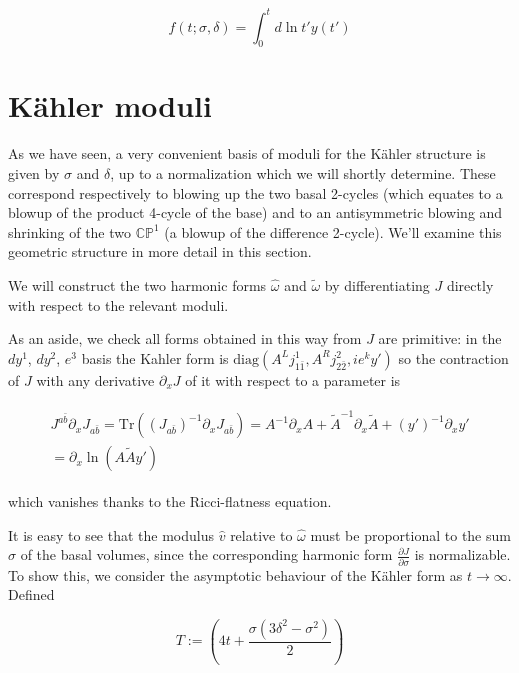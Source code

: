 \begin{equation}
	f(t;\sigma,\delta) = \int_0^{t} d\ln t' y(t')
	\label{}
\end{equation}

\section{K\"ahler moduli}

As we have seen, a very convenient basis of moduli for the K\"ahler structure is given by $\sigma$ and $\delta$, up to a normalization which we will shortly determine. These correspond respectively to blowing up the two basal 2-cycles (which equates to a blowup of the product 4-cycle of the base) and to an antisymmetric blowing and shrinking of the two $\mathbb{CP}^1$ (a blowup of the difference 2-cycle). We'll examine this geometric structure in more detail in this section.

We will construct the two harmonic forms $\hat\omega$ and $\tilde\omega$ by differentiating $J$ directly with respect to the relevant moduli.

As an aside, we check all forms obtained in this way from $J$ are primitive: in the $dy^1$, $dy^2$, $e^3$ basis the Kahler form is $\mathrm{diag}(A^L j^1_{1\bar 1}, A^R j^2_{2\bar 2}, i e^k y')$ so the contraction of $J$ with any derivative $\partial_x J$ of it with respect to a parameter is

\begin{align}
\begin{split}
	J^{a\bar b}\partial_x J_{a\bar b} = \mathrm{Tr}\left( (J_{a\bar b})^{-1} \partial_x J_{a\bar b} \right) = A^{-1} \partial_x A + \tilde A^{-1} \partial_x \tilde A + (y')^{-1} \partial_x y' \\= \partial_x \ln \left( A \tilde A y' \right)	
	\label{}
\end{split}\end{align}

which vanishes thanks to the Ricci-flatness equation.

It is easy to see that the modulus $\hat v$ relative to $\hat \omega$ must be proportional to the sum $\sigma$ of the basal volumes, since the corresponding harmonic form $\frac{\partial J}{\partial \sigma}$ is normalizable. To show this, we consider the asymptotic behaviour of the K\"ahler form as $t\rightarrow \infty$. Defined

\begin{equation}
	T := \left( 4t + \frac{\sigma(3\delta^2 - \sigma^2)}{2} \right)
	\label{}
\end{equation}

